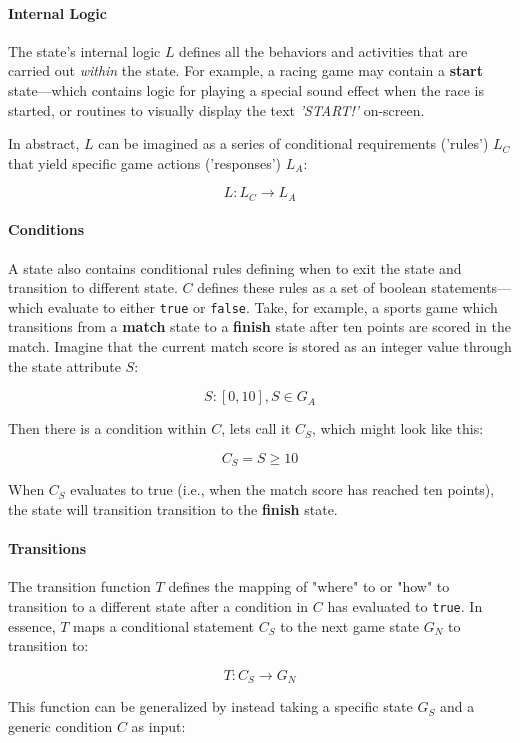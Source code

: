 \documentclass{report}
\begin{document}
\paragraph{Internal Logic}
The state's internal logic $L$ defines all the behaviors and activities that are carried out \textit{within} the state. For example, a racing game may contain a \textbf{start} state---which contains logic for playing a special sound effect when the race is started, or routines to visually display the text \textit{'START!'} on-screen. 

In abstract, $L$ can be imagined as a series of conditional requirements ('rules') $L_C$ that yield specific game actions ('responses') $L_A$:

$$L: L_C \longrightarrow L_A$$


\paragraph{Conditions}
A state also contains conditional rules defining when to exit the state and transition to different state. $C$ defines these rules as a set of boolean statements---which evaluate to either \texttt{true} or \texttt{false}.
Take, for example, a sports game which transitions from a \textbf{match} state to a \textbf{finish} state after ten points are scored in the match. Imagine that the current match score is stored as an integer value through the state attribute $S$: 

$$
S: [0, 10],  S \in G_A
$$

Then there is a condition within $C$, lets call it $C_S$, which might look like this:

$$
C_S = S\geq10 
$$

When $C_S$ evaluates to true (i.e., when the match score has reached ten points), the state will transition transition to the \textbf{finish} state.

\paragraph{Transitions}
The transition function $T$ defines the mapping of "where" to or "how" to transition to a different state after a condition in $C$ has evaluated to \texttt{true}. In essence, $T$ maps a conditional statement $C_S$ to the next game state $G_N$ to transition to:

$$
T: C_S \longrightarrow G_N
$$

This function can be generalized by instead taking a specific state $G_S$ and a generic condition $C$ as input:
\end{document}
